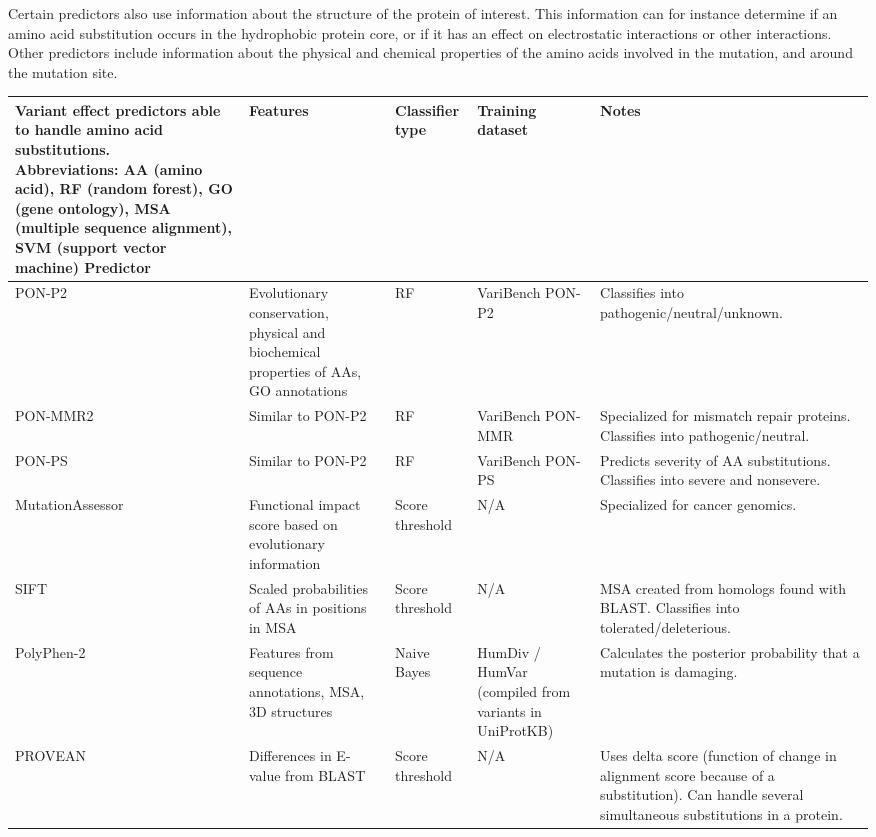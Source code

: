 Certain predictors also use information about the structure of the protein of interest. This information can for instance determine if an amino acid substitution occurs in the hydrophobic protein core, or if it has an effect on electrostatic interactions or other interactions.\cite{adzhubei2013predicting} Other predictors include information about the physical and chemical properties of the amino acids involved in the mutation, and around the mutation site.\cite{niroula2017predicting}

\clearpage
\begin{center}
\setlength\LTleft{-1.2in}
\begin{small}
\begin{longtable}{| l | L{4cm} | L{2cm} | L{3cm} | L{5cm} |}
\caption{Variant effect predictors able to handle amino acid substitutions.\\Abbreviations: AA (amino acid), RF (random forest), GO (gene ontology), MSA (multiple sequence alignment), SVM (support vector machine)}
\label{table:predictors}
\endfirsthead
\endhead
\hline
Predictor & Features & Classifier type & Training dataset & Notes \\ \hline
PON-P2 & Evolutionary conservation, physical and biochemical properties of AAs, GO annotations & RF & VariBench PON-P2 & Classifies into pathogenic/neutral/unknown.  \\ \hline
PON-MMR2 & Similar to PON-P2 & RF & VariBench PON-MMR & Specialized for mismatch repair proteins. Classifies into pathogenic/neutral. \\ \hline
PON-PS & Similar to PON-P2 & RF & VariBench PON-PS & Predicts severity of AA substitutions. Classifies into severe and nonsevere. \\ \hline
MutationAssessor & Functional impact score based on evolutionary information & Score threshold &  N/A & Specialized for cancer genomics. \\ \hline
SIFT & Scaled probabilities of AAs in positions in MSA & Score threshold & N/A & MSA created from homologs found with BLAST. Classifies into tolerated/deleterious. \\ \hline
PolyPhen-2 & Features from sequence annotations, MSA, 3D structures & Naive Bayes & HumDiv / HumVar (compiled from variants in UniProtKB) & Calculates the posterior probability that a mutation is damaging. \\ \hline
PROVEAN & Differences in E-value from BLAST & Score threshold & N/A & Uses delta score (function of change in alignment score because of a substitution). Can handle several simultaneous substitutions in a protein. \\ \hline

\end{longtable}
\end{small}
\end{center}
